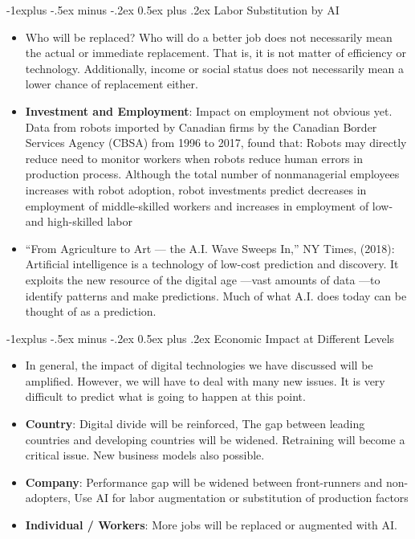 \documentclass[12pt, landscape]{article}
\makeatletter
\renewcommand{\subsection}{\@startsection{subsection}{2}{0mm}%
                                {-1explus -.5ex minus -.2ex}%
                                {0.5ex plus .2ex}%
                                {\normalfont\normalsize\bfseries}}
\makeatother
\begin{document}
\begin{multicols*}{3}
\subsection{Labor Substitution by AI}
\begin{itemize}
\item Who will be replaced? Who will do a better job does not necessarily mean the actual or immediate replacement. That is, it is not matter of efficiency or technology. Additionally, income or social status does not necessarily mean a lower chance of replacement either.
\item \textbf{Investment and Employment}: Impact on employment not obvious yet. Data from robots imported by Canadian firms by the Canadian Border Services Agency (CBSA) from 1996 to 2017, found that: Robots may directly reduce need to monitor workers when robots reduce human errors in production process. Although the total number of nonmanagerial employees increases with robot adoption, robot investments predict decreases in employment of middle-skilled workers and increases in employment of low- and high-skilled labor
\item “From Agriculture to Art — the A.I. Wave Sweeps In,” NY Times, (2018): Artificial intelligence is a technology of low-cost prediction and discovery. It exploits the new resource of the digital age —vast amounts of data —to identify patterns and make predictions. Much of what A.I. does today can be thought of as a prediction.
\end{itemize}
\subsection{Economic Impact at Different Levels}
\begin{itemize}
\item In general, the impact of digital technologies we have discussed will be amplified. However, we will have to deal with many new issues. It is very difficult to predict what is going to happen at this point.
\item \textbf{Country}: Digital divide will be reinforced, The gap between leading countries and developing countries will be widened. Retraining will become a critical issue. New business models also possible.
\item \textbf{Company}: Performance gap will be widened between front-runners and non-adopters, Use AI for labor augmentation or substitution of production factors
\item \textbf{Individual / Workers}: More jobs will be replaced or augmented with AI.
\end{itemize}

\end{multicols*}
\end{document}

